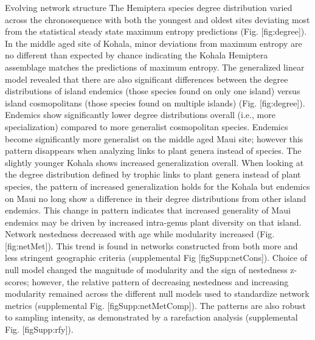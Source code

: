 \documentclass[12pt]{article}
\begin{document}
\begin{linenumbers}
Evolving network structure
The Hemiptera species degree distribution  varied across the chronosequence with both the youngest and oldest sites deviating most from the statistical steady state maximum entropy predictions (Fig. [fig:degree]). In the middle aged  site of Kohala, minor deviations from maximum entropy are no different than expected by chance indicating the Kohala Hemiptera assemblage matches the predictions of maximum entropy.
The generalized linear model revealed that there are also significant differences between the degree distributions of island endemics (those species found on only one island) versus island cosmopolitans (those species found on multiple islands) (Fig. [fig:degree]). Endemics show significantly lower degree distributions overall (i.e., more specialization) compared to more generalist cosmopolitan species. Endemics become significantly more generalist on the middle aged Maui site; however this pattern disappears when analyzing links to plant genera instead of species. The slightly younger Kohala shows increased generalization overall. When looking at the degree distribution defined by trophic links to plant genera instead of plant species, the pattern of increased generalization holds for the Kohala but endemics on Maui no long show a difference in their degree distributions from other island endemics. This change in pattern indicates that increased generality of Maui endemics may be driven by increased intra-genus plant diversity on that island.
Network nestedness decreased with age while modularity increased (Fig. [fig:netMet]). This trend is found in networks constructed from both more and less stringent geographic criteria (supplemental Fig [figSupp:netCons]). Choice of null model changed the magnitude of modularity and the sign of nestedness z-scores; however, the relative pattern of decreasing nestedness and increasing modularity remained across the different null models used to standardize network metrics (supplemental Fig. [figSupp:netMetComp]). The patterns are also robust to sampling intensity, as demonstrated by a rarefaction analysis (supplemental Fig. [figSupp:rfy]).


\end{linenumbers}
\end{document}

